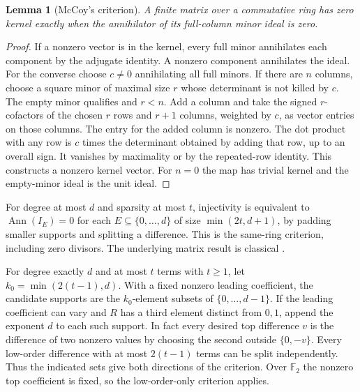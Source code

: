 \documentclass[10pt]{article}
\newtheorem{lemma}[theorem]{Lemma}
\newcommand{\Fp}{\mathbb F}
\newcommand{\ann}{\operatorname{Ann}}
\begin{document}
\begin{lemma}[McCoy's criterion]\label{lem:mccoy}
A finite matrix over a commutative ring has zero kernel exactly when
the annihilator of its full-column minor ideal is zero.
\end{lemma}
\begin{proof}
If a nonzero vector is in the kernel, every full minor annihilates
each component by the adjugate identity. A nonzero component
annihilates the ideal. For the converse choose $c\ne0$ annihilating
all full minors. If there are $n$ columns, choose a square minor of
maximal size $r$ whose determinant is not killed by $c$. The empty
minor qualifies and $r<n$. Add a column and take the signed
$r$-cofactors of the chosen $r$ rows and $r+1$ columns, weighted by
$c$, as vector entries on those columns. The entry for the added
column is nonzero. The dot product with any row is $c$ times the
determinant obtained by adding that row, up to an overall sign.
It vanishes by maximality or by the repeated-row identity. This
constructs a nonzero kernel vector. For $n=0$ the map has trivial
kernel and the empty-minor ideal is the unit ideal.
\end{proof}

For degree at most $d$ and sparsity at most $t$, injectivity is
equivalent to $\ann(I_E)=0$ for each $E\subseteq\{0,\ldots,d\}$ of
size $\min(2t,d+1)$, by padding smaller supports and splitting a
difference. This is the same-ring criterion, including zero divisors.
The underlying matrix result is classical \cite{mccoy}.

For degree exactly $d$ and at most $t$ terms with $t\ge1$, let
$k_0=\min(2(t-1),d)$. With a fixed nonzero leading coefficient,
the candidate supports are the $k_0$-element subsets of
$\{0,\ldots,d-1\}$. If the leading coefficient can vary and
$R$ has a third element distinct from $0,1$, append the exponent $d$
to each such support. In fact every desired top difference $v$ is
the difference of two nonzero values by choosing the second outside
$\{0,-v\}$. Every low-order difference with at most $2(t-1)$
terms can be split independently. Thus the indicated sets give
both directions of the criterion. Over $\Fp_2$ the nonzero top
coefficient is fixed, so the low-order-only criterion applies.
\end{document}
